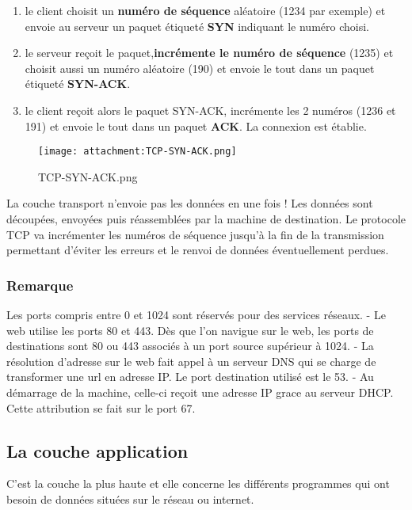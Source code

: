 \documentclass[11pt]{article}
\providecommand{\tightlist}{%
      \setlength{\itemsep}{0pt}\setlength{\parskip}{0pt}}
\begin{document}
\begin{enumerate}
\def\labelenumi{\arabic{enumi}.}
\tightlist
\item
  le client choisit un \textbf{numéro de séquence} aléatoire (1234 par
  exemple) et envoie au serveur un paquet étiqueté \textbf{SYN}
  indiquant le numéro choisi.
\item
  le serveur reçoit le paquet,\textbf{incrémente le numéro de séquence}
  (1235) et choisit aussi un numéro aléatoire (190) et envoie le tout
  dans un paquet étiqueté \textbf{SYN-ACK}.
\item
  le client reçoit alors le paquet SYN-ACK, incrémente les 2 numéros
  (1236 et 191) et envoie le tout dans un paquet \textbf{ACK}. La
  connexion est établie.
\end{enumerate}

    \begin{figure}
\centering
\texttt{[image: attachment:TCP-SYN-ACK.png]}
\caption{TCP-SYN-ACK.png}
\end{figure}

    La couche transport n'envoie pas les données en une fois ! Les données
sont découpées, envoyées puis réassemblées par la machine de
destination. Le protocole TCP va incrémenter les numéros de séquence
jusqu'à la fin de la transmission permettant d'éviter les erreurs et le
renvoi de données éventuellement perdues.

\hypertarget{remarque}{%
\subsubsection{Remarque}\label{remarque}}

Les ports compris entre 0 et 1024 sont réservés pour des services
réseaux. - Le web utilise les ports 80 et 443. Dès que l'on navigue sur
le web, les ports de destinations sont 80 ou 443 associés à un port
source supérieur à 1024. - La résolution d'adresse sur le web fait appel
à un serveur DNS qui se charge de transformer une url en adresse IP. Le
port destination utilisé est le 53. - Au démarrage de la machine,
celle-ci reçoit une adresse IP grace au serveur DHCP. Cette attribution
se fait sur le port 67.

    \hypertarget{la-couche-application}{%
\subsection{La couche application}\label{la-couche-application}}

C'est la couche la plus haute et elle concerne les différents programmes
qui ont besoin de données situées sur le réseau ou internet.
\end{document}
